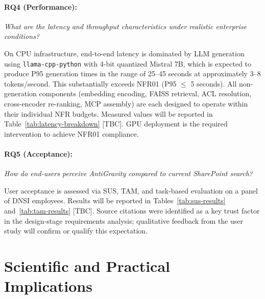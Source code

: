 \paragraph{RQ4 (Performance):} \textit{What are the latency and throughput characteristics under realistic enterprise conditions?}

On CPU infrastructure, end-to-end latency is dominated by LLM generation using \texttt{llama-cpp-python} with 4-bit quantized Mistral 7B, which is expected to produce P95 generation times in the range of 25--45 seconds at approximately 3--8 tokens/second. This substantially exceeds NFR01 (P95 $\leq$ 5 seconds). All non-generation components (embedding encoding, FAISS retrieval, ACL resolution, cross-encoder re-ranking, MCP assembly) are each designed to operate within their individual NFR budgets. Measured values will be reported in Table~\ref{tab:latency-breakdown} [TBC]. GPU deployment is the required intervention to achieve NFR01 compliance.

\paragraph{RQ5 (Acceptance):} \textit{How do end-users perceive AntiGravity compared to current SharePoint search?}

User acceptance is assessed via SUS, TAM, and task-based evaluation on a panel of DNSI employees. Results will be reported in Tables~\ref{tab:sus-results} and~\ref{tab:tam-results} [TBC]. Source citations were identified as a key trust factor in the design-stage requirements analysis; qualitative feedback from the user study will confirm or qualify this expectation.


\section{Scientific and Practical Implications}
\label{sec:conc-implications}


